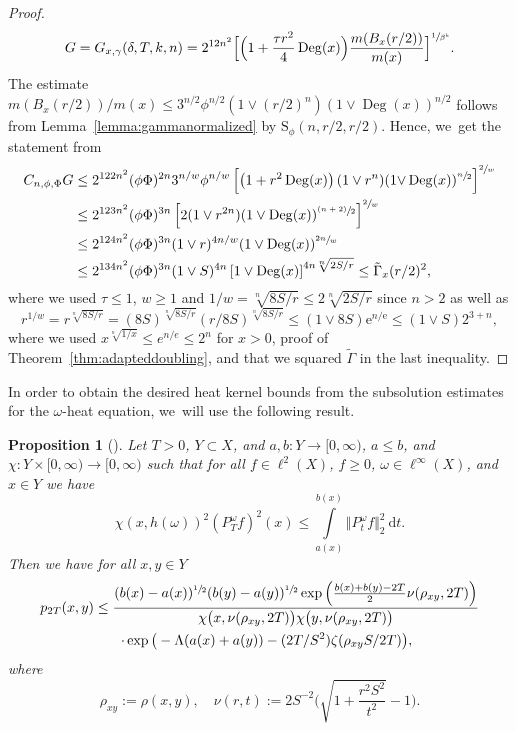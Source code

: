 \documentclass[10pt]{amsart}
\newcommand{\psfrac}[2]{\sfrac{(#1)}{#2}}
\newcommand{\rS}{\mathrm{S}}
\theoremstyle{plain}
\newtheorem{proposition}[theorem]{Proposition}
\theoremstyle{definition}
\newcommand{\drm}{\mathrm{d}}
\newcommand{\euler}{\mathrm{e}}
\DeclareMathOperator{\Deg}{Deg}
\let\oldint\int
\renewcommand{\int}{\oldint\limits}
\begin{document}
\begin{proof}
\[
G= {G_{x,\gamma}(\delta,T,k,n)} =2^{{12} n^2} \Bigl[\Bigl(1+\frac{\tau r^2}{4}\Deg(x)\Bigr) \frac{m(B_x(r/2))}{m(x)}\Bigr]^{\sfrac{1}{\beta^k}}.
\]
The estimate $m(B_x(r/2))/m(x)\leq {3}^{n/2}\phi^{n/2}(1\vee (r/2)^n)(1 {\vee}\Deg(x))^{n/2}$ follows from Lemma~\ref{lemma:gammanormalized} by $\rS_\phi(n,r/2,r/2)$. Hence, we~get the statement from
\begin{align*}
C_{n, \phi, \Phi}{G}
&\leq 2^{{122}n^2}(\phi\Phi)^{2n}{3}^{n/w}\phi^{n/w}
\left[
\left(1+{r^2} \Deg(x)
\right)(1\vee r^n)(1 {\vee}\Deg(x))^{\sfrac{n}{2}}
\right]
^{\sfrac{2}{w}}
\\
&\leq 2^{{123}n^2}(\phi\Phi)^{3n}
\left[2(1\vee r^{2n})
(1\vee \Deg(x))^{\psfrac{n+2}{2}}
\right]
^{\sfrac{2}{w}}
\\
&\leq 2^{{124}n^2}(\phi\Phi)^{3n}(1\vee r)^{4n/w}
(
1\vee \Deg(x)
)
^{\sfrac{2n}{w}}
\\
&\leq 2^{{134}n^2}(\phi\Phi)^{3n}
(1\vee S)^{4n}
\left[
1\vee \Deg(x)
\right]
^{{4}n\sqrt[ n]{2S/r}}
\leq {\tilde\Gamma_{x}(r{/2})^2},
\end{align*}
where we used
$ \tau \le 1 $, $w\geq 1$ {and $1/w=\sqrt[n]{8S/r} \leq 2\sqrt[n]{2S/r} $ since $n>2$ as well as}
\[
r^{1/w}=r^{\sqrt[n]{8S/r}}=(8S)^{\sqrt[n]{8S/r}}(r/8S)^{\sqrt[n]{8S/r}}\leq (1\vee 8S)\euler^{n/\euler}\leq (1\vee S) 2^{3+n},
\]
where we used $ x^{\sqrt[n]{1/x}} \le e^{n/e} \le 2^n $ for $ x>0 $, \cf proof of Theorem~\ref{thm:adapteddoubling}, and that we squared $ \tilde \Gamma $ in the last inequality.
\end{proof}

In order to obtain the desired heat kernel bounds from the subsolution estimates for the $\omega$-heat equation, we~will use the following result.

\begin{proposition}[{\cite[Th.\,5.3]{KellerRose-22a}}]\label{theorem:daviesabstractgraph}Let $T>0$,
$Y\subset X$, and
$a, b\colon Y \to [0,\infty)$, $a\leq b$, and $\chi\colon Y\times [0,\infty)\to [0,\infty)$ such that
for all $f\in \ell^2(X)$, $f\geq 0$, $\omega\in\ell^\infty(X)$, and $x\in Y$ we have
\[
\chi(x, h(\omega))^{2}(P_T^\omega f)^2(x)\leq \int_{a(x)}^{b(x)}\Vert P_t^\omega f\Vert_2^2\ \drm t.
\]
Then we have
for all $x,y\in Y$
\begin{multline*}
p_{2T}(x,y)
\leq
\frac
{
(b(x)-a(x))^{\sfrac{1}{2}}(b(y)-a(y))^{\sfrac{1}{2}}
\exp\left(\frac{b(x)+b(y)-2T}{2}\nu(\rho_{xy},2T)\right)
}
{\chi\big(x,\nu(\rho_{xy},2T)\big)\chi\big(y,\nu(\rho_{xy},2T)\big)}
\\
\quad \cdot\exp\big(-\Lambda(a(x)+a(y))-(2T/S^2)\zeta(\rho_{xy}S/2T)\big),
\end{multline*}
where
\[
\rho_{xy}:=\rho(x,y),\quad \nu(r,t):=2 S^{-2}\biggl(\sqrt{1+\frac{r^2S^2}{t^2}}-1\biggr).
\]
\end{proposition}
\end{document}
